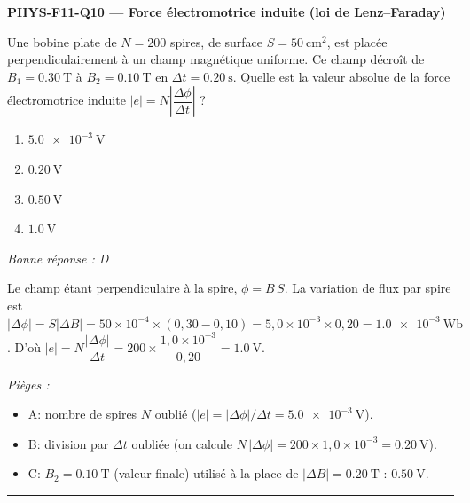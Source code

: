 \documentclass[11pt,a4paper]{article}
\newcommand{\vv}[1]{\vec{#1}}\newcommand{\ds}{\displaystyle}
\begin{document}
\noindent\textbf{PHYS-F11-Q10 --- Force électromotrice induite (loi de Lenz--Faraday)}\par
Une bobine plate de $N=200$ spires, de surface $S=\qty{50}{\centi\metre\squared}$, est placée perpendiculairement à un champ magnétique uniforme. Ce champ décroît de $B_1=\qty{0.30}{\tesla}$ à $B_2=\qty{0.10}{\tesla}$ en $\Delta t=\qty{0.20}{\second}$. Quelle est la valeur absolue de la force électromotrice induite $\left|e\right|=N\left|\dfrac{\Delta\phi}{\Delta t}\right|$ ?
\begin{center}
\end{center}
\begin{enumerate}[label=\Alph*)]
\item $\qty{5.0e-3}{\volt}$
\item $\qty{0.20}{\volt}$
\item $\qty{0.50}{\volt}$
\item $\qty{1.0}{\volt}$
\end{enumerate}
\textit{Bonne réponse : D}\par
Le champ étant perpendiculaire à la spire, $\phi=B\,S$. La variation de flux par spire est $\left|\Delta\phi\right|=S\left|\Delta B\right|=50\times10^{-4}\times(0{,}30-0{,}10)=5{,}0\times10^{-3}\times0{,}20=\qty{1.0e-3}{\weber}$. D'où $\left|e\right|=N\dfrac{\left|\Delta\phi\right|}{\Delta t}=200\times\dfrac{1{,}0\times10^{-3}}{0{,}20}=\qty{1.0}{\volt}$.\par
\textit{Pièges :}
\begin{itemize}
\item A: nombre de spires $N$ oublié ($\left|e\right|=\left|\Delta\phi\right|/\Delta t=\qty{5.0e-3}{\volt}$).
\item B: division par $\Delta t$ oubliée (on calcule $N\,\left|\Delta\phi\right|=200\times1{,}0\times10^{-3}=\qty{0.20}{\volt}$).
\item C: $B_2=\qty{0.10}{\tesla}$ (valeur finale) utilisé à la place de $\left|\Delta B\right|=\qty{0.20}{\tesla}$ : $\qty{0.50}{\volt}$.
\end{itemize}
\vspace{8pt}\hrule\vspace{8pt}
\end{document}
